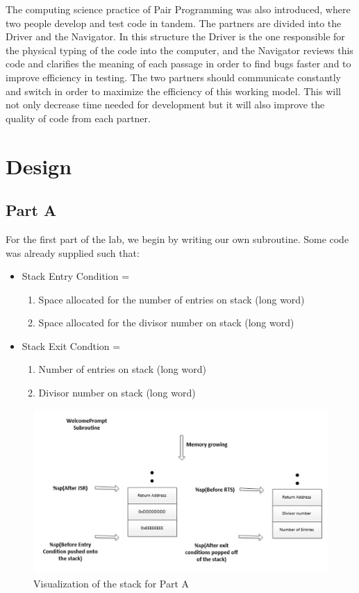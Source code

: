 \documentclass[letterpaper]{article}
\begin{document}
  The computing science practice of Pair Programming was also introduced, where two people
  develop and test code in tandem.  The partners are divided into the Driver and the Navigator.
  In this structure the Driver is the one responsible for the physical typing of the code into the computer,
  and the Navigator reviews this code and clarifies the meaning of each passage in order to find bugs faster
  and to improve efficiency in testing.  The two partners should communicate constantly and switch in order
  to maximize the efficiency of this working model.  This will not only decrease time needed for development
  but it will also improve the quality of code from each partner.


\section{Design}
  \subsection{Part A}
    For the first part of the lab, we begin by writing our own subroutine.
    Some code was already supplied such that:
    \begin{itemize}
      \item Stack Entry Condition =
        \begin{enumerate}
          \item Space allocated for the number of entries on stack (long word)
          \item Space allocated for the divisor number on stack (long word)
        \end{enumerate}
      \item Stack Exit Condtion =
        \begin{enumerate}
          \item Number of entries on stack (long word)
          \item Divisor number on stack (long word)
        \end{enumerate}
    \end{itemize}

    \begin{figure}[h!]
      \centering
      \includegraphics[width=.8\textwidth]{designa.jpg}
      \caption{Visualization of the stack for Part A}
    \end{figure}
\end{document}
